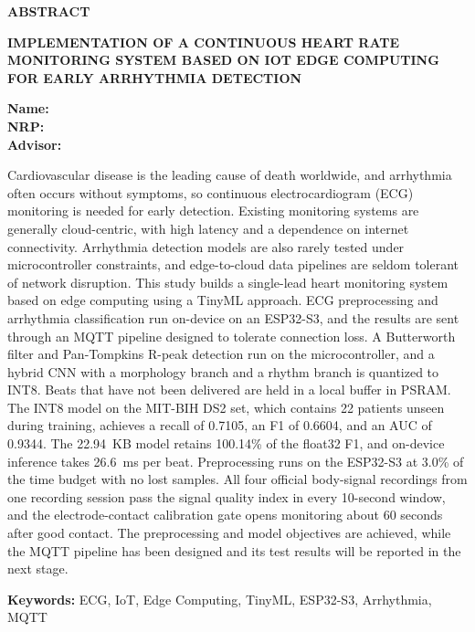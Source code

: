 \clearpage
\thispagestyle{plain}
{}

{\centering\fontsize{12}{14}\selectfont\bfseries ABSTRACT\par}

\vspace{0.2cm}

{\noindent\raggedright
\textbf{IMPLEMENTATION OF A CONTINUOUS HEART RATE MONITORING SYSTEM BASED ON IOT EDGE COMPUTING FOR EARLY ARRHYTHMIA DETECTION}\par}

\vspace{0.2cm}

\noindent
\textbf{Name\hspace{1.55cm}: \NamaMahasiswa}\\
\textbf{NRP\hspace{1.75cm}: \NRP}\\
\textbf{Advisor\hspace{1.2cm}: \PembimbingSatu}\\
\textbf{\PembimbingDua}

\vspace{0.2cm}

Cardiovascular disease is the leading cause of death worldwide, and arrhythmia often occurs without symptoms, so continuous electrocardiogram (ECG) monitoring is needed for early detection. Existing monitoring systems are generally cloud-centric, with high latency and a dependence on internet connectivity. Arrhythmia detection models are also rarely tested under microcontroller constraints, and edge-to-cloud data pipelines are seldom tolerant of network disruption. This study builds a single-lead heart monitoring system based on edge computing using a TinyML approach. ECG preprocessing and arrhythmia classification run on-device on an ESP32-S3, and the results are sent through an MQTT pipeline designed to tolerate connection loss. A Butterworth filter and Pan-Tompkins R-peak detection run on the microcontroller, and a hybrid CNN with a morphology branch and a rhythm branch is quantized to INT8. Beats that have not been delivered are held in a local buffer in PSRAM. The INT8 model on the MIT-BIH DS2 set, which contains 22 patients unseen during training, achieves a recall of 0.7105, an F1 of 0.6604, and an AUC of 0.9344. The 22.94~KB model retains 100.14\% of the float32 F1, and on-device inference takes 26.6~ms per beat. Preprocessing runs on the ESP32-S3 at 3.0\% of the time budget with no lost samples. All four official body-signal recordings from one recording session pass the signal quality index in every 10-second window, and the electrode-contact calibration gate opens monitoring about 60 seconds after good contact. The preprocessing and model objectives are achieved, while the MQTT pipeline has been designed and its test results will be reported in the next stage.

\vspace{0.25cm}
\noindent
\textbf{Keywords:} ECG, IoT, Edge Computing, TinyML, ESP32-S3, Arrhythmia, MQTT

\clearpage
